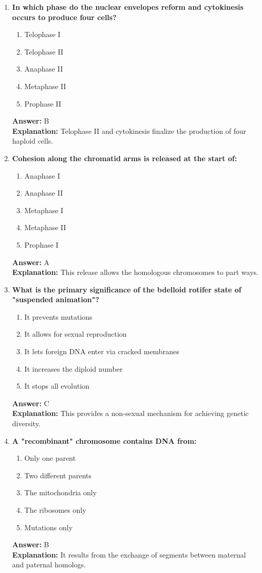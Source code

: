 \documentclass[11pt, a4paper]{article}
\begin{document}
\begin{enumerate}[leftmargin=*, label=\arabic*.]
\item \textbf{In which phase do the nuclear envelopes reform and cytokinesis occurs to produce four cells?}
\begin{enumerate}[label=\Alph*.]
\item Telophase I
\item Telophase II
\item Anaphase II
\item Metaphase II
\item Prophase II
\end{enumerate}
\textbf{Answer:} B \\
\textbf{Explanation:} Telophase II and cytokinesis finalize the production of four haploid cells.

\item \textbf{Cohesion along the chromatid arms is released at the start of:}
\begin{enumerate}[label=\Alph*.]
\item Anaphase I
\item Anaphase II
\item Metaphase I
\item Metaphase II
\item Prophase I
\end{enumerate}
\textbf{Answer:} A \\
\textbf{Explanation:} This release allows the homologous chromosomes to part ways.

\item \textbf{What is the primary significance of the bdelloid rotifer state of "suspended animation"?}
\begin{enumerate}[label=\Alph*.]
\item It prevents mutations
\item It allows for sexual reproduction
\item It lets foreign DNA enter via cracked membranes
\item It increases the diploid number
\item It stops all evolution
\end{enumerate}
\textbf{Answer:} C \\
\textbf{Explanation:} This provides a non-sexual mechanism for achieving genetic diversity.

\item \textbf{A "recombinant" chromosome contains DNA from:}
\begin{enumerate}[label=\Alph*.]
\item Only one parent
\item Two different parents
\item The mitochondria only
\item The ribosomes only
\item Mutations only
\end{enumerate}
\textbf{Answer:} B \\
\textbf{Explanation:} It results from the exchange of segments between maternal and paternal homologs.


\end{enumerate}
\end{document}
